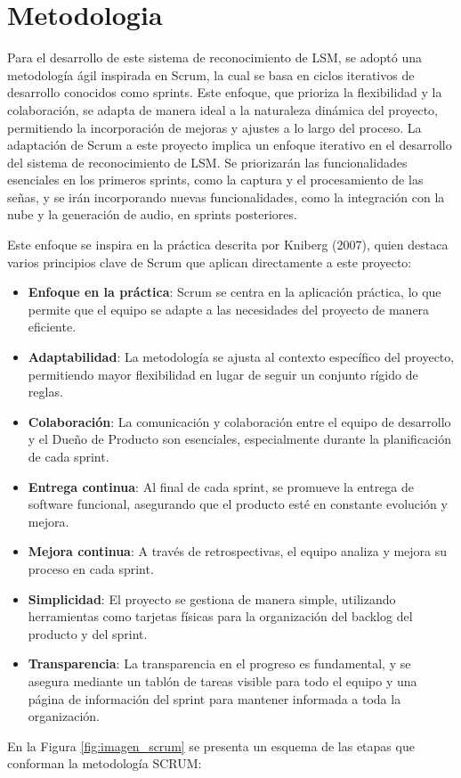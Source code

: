 \section{Metodologia}
Para el desarrollo de este sistema de reconocimiento de LSM, se adoptó una metodología ágil inspirada en Scrum, la cual se basa en ciclos iterativos de desarrollo conocidos como sprints. Este enfoque, que prioriza la flexibilidad y la colaboración, se adapta de manera ideal a la naturaleza dinámica del proyecto, permitiendo la incorporación de mejoras y ajustes a lo largo del proceso. La adaptación de Scrum a este proyecto implica un enfoque iterativo en el desarrollo del sistema de reconocimiento de LSM. Se priorizarán las funcionalidades esenciales en los primeros sprints, como la captura y el procesamiento de las señas, y se irán incorporando nuevas funcionalidades, como la integración con la nube y la generación de audio, en sprints posteriores.

Este enfoque se inspira en la práctica descrita por Kniberg (2007), quien destaca varios principios clave de Scrum que aplican directamente a este proyecto\cite{ref39}:

\begin{itemize}
    \item \textbf{Enfoque en la práctica}: Scrum se centra en la aplicación práctica, lo que permite que el equipo se adapte a las necesidades del proyecto de manera eficiente.
    \item \textbf{Adaptabilidad}: La metodología se ajusta al contexto específico del proyecto, permitiendo mayor flexibilidad en lugar de seguir un conjunto rígido de reglas.
    \item \textbf{Colaboración}: La comunicación y colaboración entre el equipo de desarrollo y el Dueño de Producto son esenciales, especialmente durante la planificación de cada sprint.
    \item \textbf{Entrega continua}: Al final de cada sprint, se promueve la entrega de software funcional, asegurando que el producto esté en constante evolución y mejora.
    \item \textbf{Mejora continua}: A través de retrospectivas, el equipo analiza y mejora su proceso en cada sprint.
    \item \textbf{Simplicidad}: El proyecto se gestiona de manera simple, utilizando herramientas como tarjetas físicas para la organización del backlog del producto y del sprint.
    \item \textbf{Transparencia}: La transparencia en el progreso es fundamental, y se asegura mediante un tablón de tareas visible para todo el equipo y una página de información del sprint para mantener informada a toda la organización.
\end{itemize}
En la Figura \ref{fig:imagen_scrum} se presenta un esquema de las etapas que conforman la metodología SCRUM:

